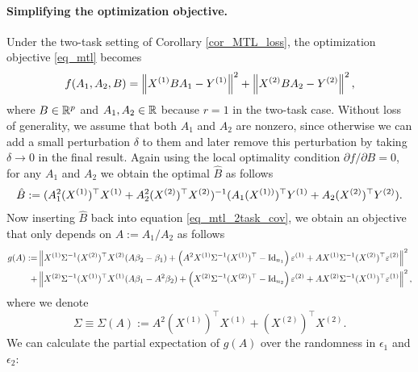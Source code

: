  \fi

\paragraph{Simplifying the optimization objective.} 
Under the two-task setting of Corollary \ref{cor_MTL_loss}, the optimization objective \eqref{eq_mtl} becomes
	\begin{align}
		f(A_1,A_2, B) =   \left\| X^{(1)} B A_1 - Y^{(1)} \right\|^2+ \left\| X^{(2)} B A_2 - Y^{(2)} \right\|^2, \label{eq_mtl_2task_cov}
	\end{align}
	where $B \in \mathbb{R}^{p}$ and $A_1, A_2\in \mathbb{R}$ because $r=1$ in the two-task case. %
	Without loss of generality, we assume that both $A_1$ and $A_2$ are nonzero, since otherwise we can add a small perturbation $\delta$ to them and later remove this perturbation by taking $\delta\to 0$ in the final result. Again using the local optimality condition ${\partial f}/{\partial B} = 0$, for any $A_1$ and $A_2$ we obtain the optimal $\hat{B}$ as follows
	\begin{align}
		\hat{B} \define  (A_1^2 (X^{(1)})^{\top}X^{(1)} + A_2^2 (X^{(2)})^{\top}X^{(2)})^{-1} (A_1 (X^{(1))})^{\top}Y^{(1)} + A_2 (X^{(2)})^{\top}Y^{(2)}). \label{eq_Bhat_2task} %
	\end{align}
 Now inserting $\hat B$ back into equation \eqref{eq_mtl_2task_cov}, we obtain an objective that only depends on $A:=A_1/A_2$ as follows 
 \begin{align}
		 g(A) := & \left\| X^{(1)} \Sigma^{-1} (X^{(2)})^\top X^{(2)} (A\beta_2-\beta_1)+ \left(A^2 X^{(1)}\Sigma^{-1} (X^{(1)})^\top-\operatorname{Id}_{n_1}\right)\varepsilon^{(1)} + A X^{(1)}\Sigma^{-1} (X^{(2)})^\top \varepsilon^{(2)} \right\|^2 \nonumber\\
		 + & \left\| X^{(2)} \Sigma^{-1} (X^{(1)})^\top X^{(1)} (A\beta_1-A^2\beta_2)+ \left(X^{(2)}\Sigma^{-1} (X^{(2)})^\top-\operatorname{Id}_{n_2}\right)\varepsilon^{(2)} + A X^{(2)}\Sigma^{-1} (X^{(1)})^\top \varepsilon^{(1)} \right\|^2, 
		\label{eq_mtl_A12}
	\end{align}
	where we denote
	$$\Sigma\equiv \Sigma(A):= A^2 (X^{(1)})^\top X^{(1)}  + (X^{(2)})^\top X^{(2)} .$$
We can calculate the partial expectation of $g(A)$ over the randomness in $\epsilon_1$ and $\epsilon_2$:
